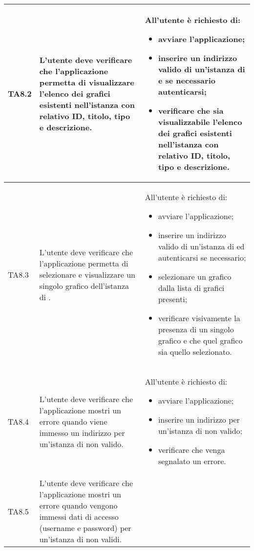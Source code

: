 \begin{longtabu}{| X[0.5] | X | X |}
	TA8.2 & L'utente deve verificare che l'applicazione  permetta di visualizzare l'elenco dei grafici esistenti nell'istanza \projectname{} con relativo ID, titolo, tipo e descrizione.

		& All'utente è richiesto di:
		\begin{itemize}
			\item avviare l'applicazione;
			\item inserire un indirizzo valido di un'istanza di \projectname{} e se necessario autenticarsi;
			\item verificare che sia visualizzabile l'elenco dei grafici esistenti nell'istanza \projectname{} con relativo ID, titolo, tipo e descrizione.
		\end{itemize}
\\ \hline

	TA8.3 & L'utente deve verificare che l'applicazione  permetta di selezionare e visualizzare un singolo grafico dell'istanza di \projectname{}.

		& All'utente è richiesto di:
		\begin{itemize}
			\item avviare l'applicazione;
			\item inserire un indirizzo valido di un'istanza di \projectname{} ed autenticarsi se necessario;
			\item selezionare un grafico dalla lista di grafici presenti;
			\item verificare visivamente la presenza di un singolo grafico e che quel grafico sia quello selezionato.
		\end{itemize}
\\ \hline

	TA8.4 & L'utente deve verificare che l'applicazione  mostri un errore quando viene immesso un indirizzo per un'istanza di \projectname{} non valido.

		& All'utente è richiesto di:
		\begin{itemize}
			\item avviare l'applicazione;
			\item inserire un indirizzo per un'istanza di \projectname{} non valido;
			\item verificare che venga segnalato un errore.
		\end{itemize}
\\ \hline

	TA8.5 & L'utente deve verificare che l'applicazione  mostri un errore quando vengono immessi dati di accesso (username e password) per un'istanza di \projectname{} non validi.


\end{longtabu}
